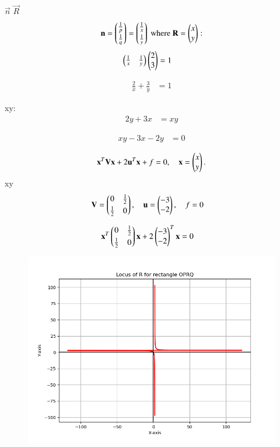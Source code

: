 \documentclass[journal]{IEEEtran}
\begin{document}
 $\vec{n}$  $\vec{R}$ 
\begin{align}
\mathbf{n}=\begin{pmatrix}\tfrac{1}{p}\\[3pt]\tfrac{1}{q}\end{pmatrix}=\begin{pmatrix}\tfrac{1}{x}\\[3pt]\tfrac{1}{y}\end{pmatrix}\text{ where } \mathbf{R}=\begin{pmatrix}x\\y\end{pmatrix}:
\end{align}
\begin{align}
\begin{pmatrix}\tfrac{1}{x} & \tfrac{1}{y}\end{pmatrix}\begin{pmatrix}2\\3\end{pmatrix} &= 1
\end{align}

\begin{align}
\tfrac{2}{x} + \tfrac{3}{y} &= 1
\end{align}

 xy:
\begin{align}
2y + 3x &= xy
\end{align}

\begin{align}
xy - 3x - 2y &= 0
\end{align}

\begin{align}
\mathbf{x}^T \mathbf{V} \mathbf{x} + 2 \mathbf{u}^T \mathbf{x} + f = 0, \quad \mathbf{x} = \begin{pmatrix}x\\y\end{pmatrix}.
\end{align}
 xy 
\begin{align}
\mathbf{V} &= \begin{pmatrix}0 & \tfrac{1}{2} \\[1mm] \tfrac{1}{2} & 0\end{pmatrix}, \quad
\mathbf{u} = \begin{pmatrix}-3\\-2\end{pmatrix}, \quad f = 0
\end{align}

\begin{align}
\mathbf{x}^T \begin{pmatrix}0 & \tfrac{1}{2} \\[1mm] \tfrac{1}{2} & 0\end{pmatrix} \mathbf{x} + 2 \begin{pmatrix}-3\\-2\end{pmatrix}^T \mathbf{x} &= 0
\end{align}
\begin{figure}[H]
    \centering
    \includegraphics[width=0.5\columnwidth]{figs/fig1.png}
    \caption{}
    \label{fig:placeholder}
\end{figure}
\end{document}
